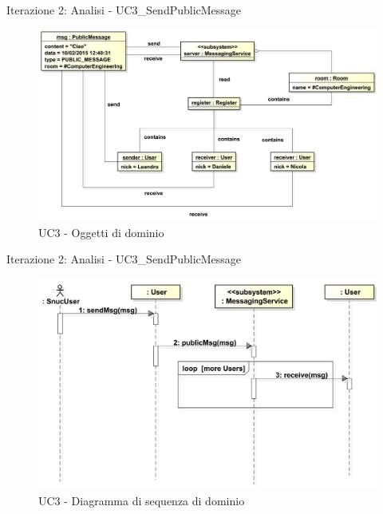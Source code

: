 \begin{frame} {Iterazione 2: Analisi - UC3\_SendPublicMessage}
   \begin{figure}
     \includegraphics[scale=0.225]{image_astah/Iteration_2_DomainModel/UC3_SendPublicMessage_OM.png}{\centering}
     \caption{UC3 - Oggetti di dominio}
     \label{fig_UC3_SPM_OM} 
   \end{figure}
\end{frame}

\begin{frame} {Iterazione 2: Analisi - UC3\_SendPublicMessage}
   \begin{figure}
     \includegraphics[scale=0.27]{image_astah/Iteration_2_DomainModel/UC3_SendPublicMessage_SSD.png}{\centering}
     \caption{UC3 - Diagramma di sequenza di dominio}
     \label{fig_UC3_SPM_SSD} 
   \end{figure}
\end{frame}

